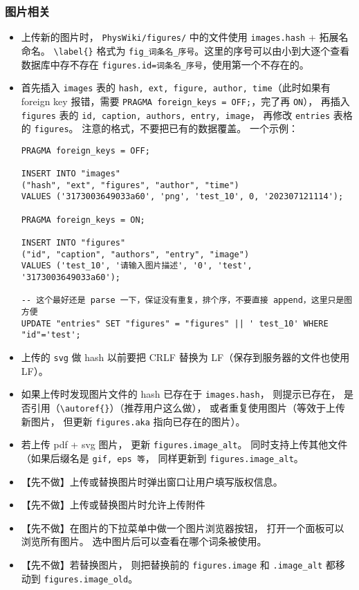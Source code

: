 \subsubsection{图片相关}
\begin{itemize}
\item 上传新的图片时， \verb|PhysWiki/figures/| 中的文件使用 \verb|images.hash| + 拓展名命名。 \verb|\label{}| 格式为 \verb|fig_词条名_序号|。这里的序号可以由小到大逐个查看数据库中存不存在 \verb|figures.id=词条名_序号|，使用第一个不存在的。
\item 首先插入 \verb|images| 表的 \verb|hash, ext, figure, author, time|（此时如果有 foreign key 报错，需要 \verb|PRAGMA foreign_keys = OFF;|，完了再 \verb|ON|）， 再插入 \verb|figures| 表的 \verb|id, caption, authors, entry, image|， 再修改 \verb|entries| 表格的 \verb|figures|。 注意的格式，不要把已有的数据覆盖。 一个示例：
\begin{lstlisting}[language=none]
PRAGMA foreign_keys = OFF;

INSERT INTO "images"
("hash", "ext", "figures", "author", "time")
VALUES ('3173003649033a60', 'png', 'test_10', 0, '202307121114');

PRAGMA foreign_keys = ON;

INSERT INTO "figures"
("id", "caption", "authors", "entry", "image")
VALUES ('test_10', '请输入图片描述', '0', 'test', '3173003649033a60');

-- 这个最好还是 parse 一下，保证没有重复，排个序，不要直接 append，这里只是图方便
UPDATE "entries" SET "figures" = "figures" || ' test_10' WHERE "id"='test';
\end{lstlisting}
\item 上传的 \verb|svg| 做 hash 以前要把 CRLF 替换为 LF（保存到服务器的文件也使用 LF）。
\item 如果上传时发现图片文件的 hash 已存在于 \verb|images.hash|， 则提示已存在， 是否引用（\verb|\autoref{}|）（推荐用户这么做）， 或者重复使用图片（等效于上传新图片， 但更新 \verb|figures.aka| 指向已存在的图片）。 
\item 若上传 pdf + svg 图片， 更新 \verb|figures.image_alt|。 同时支持上传其他文件（如果后缀名是 \verb|gif, eps 等|， 同样更新到 \verb|figures.image_alt|。
\item 【先不做】上传或替换图片时弹出窗口让用户填写版权信息。
\item 【先不做】上传或替换图片时允许上传附件
\item 【先不做】在图片的下拉菜单中做一个图片浏览器按钮， 打开一个面板可以浏览所有图片。 选中图片后可以查看在哪个词条被使用。
\item 【先不做】若替换图片， 则把替换前的 \verb|figures.image| 和 \verb|.image_alt| 都移动到 \verb|figures.image_old|。 
\end{itemize}

